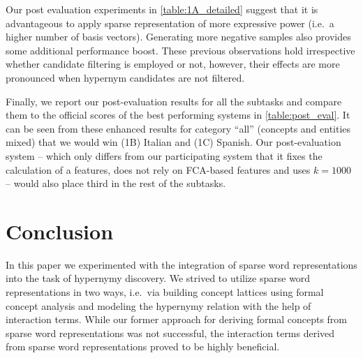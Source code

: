 \documentclass[11pt,a4paper]{article}
\begin{document}


Our post evaluation experiments in \autoref{table:1A_detailed} suggest that it 
is advantageous to apply sparse representation of more expressive power (i.e.~a 
higher number of basis vectors). Generating more negative samples also provides 
some additional performance boost. These previous observations hold 
irrespective whether candidate filtering is employed or not, however, their 
effects are more pronounced when hypernym candidates are not filtered.

Finally, we report our post-evaluation results for all the subtasks and compare
them to the official scores  of the best performing systems in 
\autoref{table:post_eval}. It can be seen from these enhanced results for 
category ``all'' (concepts and entities mixed) that we would win (1B) Italian 
and (1C) Spanish. Our post-evaluation system -- which only differs from our 
participating system that it fixes the calculation of a features, does 
not rely on FCA-based features and uses $k=1000$ -- would also place third in 
the rest of the subtasks.



\section{Conclusion}

In this paper we experimented with the integration of sparse word 
representations into the task of hypernymy discovery. We strived to utilize 
sparse word representations in two ways, i.e.~via building concept lattices 
using formal concept analysis and modeling the hypernymy relation with the help 
of interaction terms. While our former approach for deriving formal concepts 
from sparse word representations was not successful, the interaction terms 
derived from sparse word representations proved to be highly beneficial.




\end{document}
